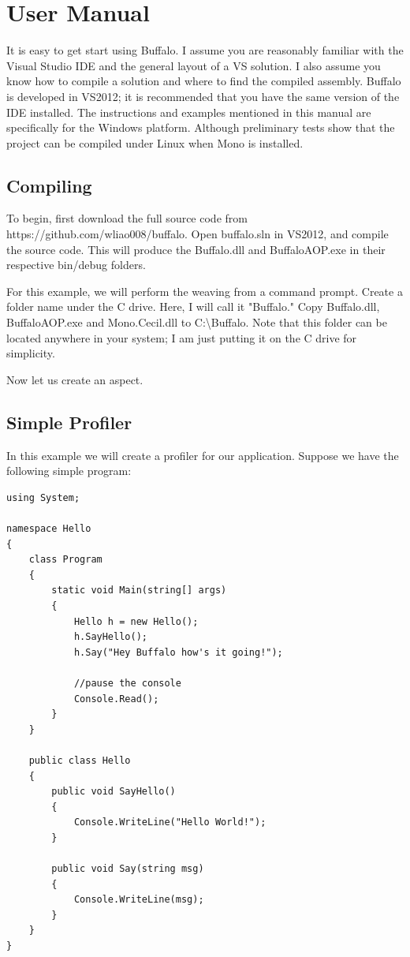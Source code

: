 \chapter{User Manual}

It is easy to get start using Buffalo. I assume you are reasonably familiar with the Visual Studio IDE and the general layout of a VS solution. I also assume you know how to compile a solution and where to find the compiled assembly. Buffalo is developed in VS2012; it is recommended that you have the same version of the IDE installed. The instructions and examples mentioned in this manual are specifically for the Windows platform. Although preliminary tests show that the project can be compiled under Linux when Mono is installed. 

\section{Compiling}
To begin, first download the full source code from https://github.com/wliao008/buffalo. Open buffalo.sln in VS2012, and compile the source code. This will produce the Buffalo.dll and BuffaloAOP.exe in their respective bin/debug folders.

For this example, we will perform the weaving from a command prompt. Create a folder name under the C drive. Here, I will call it "Buffalo." Copy Buffalo.dll, BuffaloAOP.exe and Mono.Cecil.dll to C:\textbackslash{Buffalo}. Note that this folder can be located anywhere in your system; I am just putting it on the C drive for simplicity.

Now let us create an aspect.

\section{Simple Profiler}
In this example we will create a profiler for our application. Suppose we have the following simple program:

\begin{lstlisting}[caption={Hello Program}, label=helloprogram, frame=tb, basicstyle=\scriptsize]
using System;

namespace Hello
{
    class Program
    {
        static void Main(string[] args)
        {
            Hello h = new Hello();
            h.SayHello();
            h.Say("Hey Buffalo how's it going!");

            //pause the console
            Console.Read();
        }
    }

    public class Hello
    {
        public void SayHello()
        {
            Console.WriteLine("Hello World!");
        }

        public void Say(string msg)
        {
            Console.WriteLine(msg);
        }
    }
}
\end{lstlisting}

